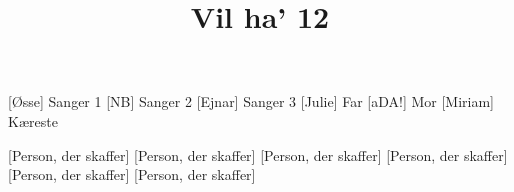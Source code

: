 \documentclass[a4paper,11pt]{article}
\title{Vil ha' 12}
\begin{document}
\maketitle

\begin{roles}
[Øsse] Sanger 1
[NB] Sanger 2
[Ejnar] Sanger 3
[Julie] Far
[aDA!] Mor
[Miriam] Kæreste
\end{roles}

\begin{props}
[Person, der skaffer]
[Person, der skaffer]
[Person, der skaffer]
[Person, der skaffer]
[Person, der skaffer]
[Person, der skaffer]
\end{props}
\end{document}

